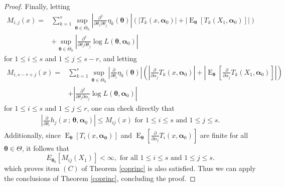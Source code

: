 \documentclass[10pt,a4paper,onecolumn]{article} %
\newcommand{\f}{\on}
\newcommand{\bs}{\boldsymbol}
\newcommand{\on}{\operatorname}
\begin{document}
\begin{appendix}
\begin{proof}
Finally, letting
\begin{equation*}
\begin{aligned}
M_{i,j}(x)= &\sum_{k=1}^s \sup_{\bs{\theta}\in \overline{\Theta}_0} \left|\frac{\partial^2}{\partial \theta_i \partial \theta_j} \eta_k(\bs{\theta})\right|\left(\left|T_k(x,\bs{\alpha}_0)\right|+\left|\on{E}_{\bs{\theta}}\left[T_k(X_1,\bs{\alpha}_0)\right]\right|\right)\\&+\sup_{\bs{\theta}\in \overline{\Theta}_0}\left|\frac{\partial^2}{\partial \theta_i \partial \theta_j}\log L(\bs{\theta},\bs{\alpha}_0)\right|
\end{aligned}
\end{equation*}
for $1\leq i\leq s$ and $1\leq j\leq s-r$, and letting
\begin{equation*}
\begin{aligned}
M_{i,s-r+j}(x)=&\sum_{k=1}^s \sup_{\bs{\theta}\in \overline{\Theta}_0}\left| \frac{\partial}{\partial \theta_i} \eta_k(\bs{\theta})\right|\left(\left|\frac{\partial}{\partial \alpha_j}T_k(x,\bs{\alpha}_0)\right|+\left|\on{E}_{\bs{\theta}}\left[\frac{\partial}{\partial \alpha_j}T_k(X_1,\bs{\alpha}_0)\right]\right|\right)\\&+\left|\frac{\partial^2}{\partial \theta_i \partial \alpha_j}\log L(\bs{\theta},\bs{\alpha}_0)\right|
\end{aligned}
\end{equation*}
for $1\leq i\leq s$ and $1\leq j\leq r$, one can check directly that
\begin{equation*}
 \begin{aligned}
 \left|\frac{\partial}{\partial\theta_i} h_j(x\, ;\, \bs{\theta},\bs{\alpha}_0)\right|\leq M_{ij}(x)\mbox{ for }1\leq i\leq s\mbox{ and }1\leq j\leq s.
 \end{aligned}
 \end{equation*}
 Additionally, since $\f{E}_{\bs{\theta}}\left[T_i(x,\bs{\alpha_0})\right]$ and $\f{E}_{\bs{\theta}}\left[\frac{\partial}{\partial \alpha_j} T_i(x,\bs{\alpha}_0)\right]$ are finite for all $\bs{\theta}\in \Theta$, it follows that
\begin{equation*}E_{\bs{\theta}_0}\left[M_{ij}(X_1)\right]<\infty,\mbox{ for all }1\leq i\leq s \mbox{ and }1\leq j\leq s.
\end{equation*}
which proves item $(C)$ of Theorem \ref{coprinc} is also satisfied. Thus we can apply the conclusions of Theorem \ref{coprinc}, concluding the proof.
\end{proof}


\end{appendix} 




\end{document}
